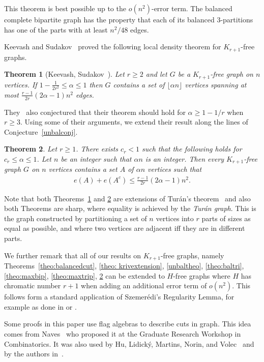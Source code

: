 \documentclass[11pt]{article}
\newtheorem{theo}{Theorem}
\theoremstyle{definition}
\numberwithin{theo}{section}
\begin{document}
This theorem is best possible up to the $o(n^2)$-error term. The balanced complete bipartite graph has the property that each of its balanced $3$-partitions has one of the parts with at least $n^2/48$ edges. 

Keevash and Sudakov~\cite{MR1967401} proved the following local density theorem for $K_{r+1}$-free graphs. 
\begin{theo}[Keevash, Sudakov~\cite{MR1967401}]
\label{SudakobKeevashclique}
Let $r\geq 2$ and let $G$ be a $K_{r+1}$-free graph on $n$ vertices. If $1-\frac{1}{2r^2}\leq \alpha\leq 1$ then $G$ contains a set of $\lfloor \alpha n\rfloor$ vertices spanning at most $\frac{r-1}{2r}(2\alpha-1)n^2$ edges.
\end{theo}
They~\cite{MR1967401} also conjectured that their theorem should hold for $\alpha\geq 1-1/r$ when $r\geq 3$. Using some of their arguments, we extend their result along the lines of Conjecture~\ref{unbalconj}.
\begin{theo}
\label{KeevashSudakovextension}
Let $r\geq 1$. There exists $c_r<1$ such that the following holds for $c_r\leq \alpha\leq 1$. Let $n$ be an integer such that $\alpha n$ is an integer. Then every $K_{r+1}$-free graph $G$ on $n$ vertices contains a set $A$ of $ \alpha n$ vertices such that 
\begin{align*}
    e(A)+e(A^c)\leq  \frac{r-1}{2r}(2\alpha-1)n^2.
\end{align*}
\end{theo}
Note that both Theorems~\ref{SudakobKeevashclique} and \ref{KeevashSudakovextension} are extensions of Tur\'an's theorem~\cite{Turanstheorem} and also both Theorems are sharp, where equality is achieved by the \emph{Tur\'an graph}. This is the graph constructed by partitioning a set of $n$ vertices into $r$ parts of sizes as equal as possible, and where two vertices are adjacent iff they are in different parts.


We further remark that all of our results on $K_{r+1}$-free graphs, namely Theorems~\ref{theo:balancedcut}, \ref{theo: krivextension}, \ref{unbaltheo}, \ref{theo:baltri}, \ref{theo:maxbip}, \ref{theo:maxtrip}, \ref{KeevashSudakovextension} can be extended to $H$-free graphs where $H$ has chromatic number $r+1$ when adding an additional error term of $o(n^2)$. This follows form a standard application of Szemer\'edi's Regularity Lemma, for example as done in \cite{MR1967401} or \cite{MR2359832}.

Some proofs in this paper use flag algebras to describe cuts in graph. This idea comes from Naves~\cite{navesgrwc} who proposed it at the Graduate Research Workshop in Combinatorics. It was also used by Hu, Lidick\'y, Martins, Norin, and Volec~\cite{flagmulti} and by the authors in~\cite{flagbipartite}.
\end{document}

